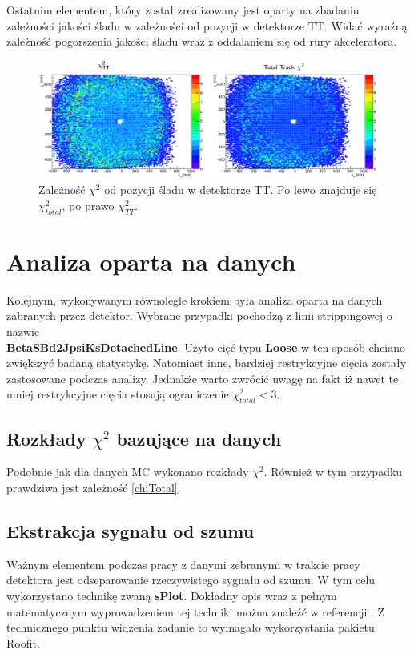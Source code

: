 Ostatnim elementem, który został zrealizowany jest oparty na zbadaniu zależności jakości śladu w zależności od pozycji w detektorze TT. Widać wyraźną zależność pogorszenia jakości śladu wraz z oddalaniem się od rury akceleratora. 

 \begin{figure}[H]
 \centering
 \includegraphics[scale=0.35]{rozdzial6/Chi2_vs_position_TT.png}
 \caption{Zależność $\chi^2$ od pozycji śladu w detektorze TT. Po lewo znajduje się $\chi^2_{total}$, po prawo $\chi^2_{TT}$. }
 \label{rys:BJPsi}
\end{figure}

\section{Analiza oparta na danych}
Kolejnym, wykonywanym równolegle krokiem była analiza oparta na danych zabranych przez detektor. Wybrane przypadki pochodzą z linii strippingowej o nazwie \\ \textbf{BetaSBd2JpsiKsDetachedLine}. Użyto cięć typu \textbf{Loose} w ten sposób chciano zwiększyć badaną statystykę. Natomiast inne, bardziej restrykcyjne cięcia zostały zastosowane podczas analizy. Jednakże warto zwrócić uwagę na fakt iż nawet te mniej restrykcyjne cięcia stosują ograniczenie $\chi^2_{total}<3$. 

\subsection{Rozkłady $\chi^2$ bazujące na danych}
Podobnie jak dla danych MC wykonano rozkłady $\chi^2$. Również w tym przypadku prawdziwa jest zależność \ref{chiTotal}.  

\subsection{Ekstrakcja sygnału od szumu}
Ważnym elementem podczas pracy z danymi zebranymi w trakcie pracy detektora jest odseparowanie rzeczywistego sygnału od szumu. W tym celu wykorzystano technikę zwaną \textbf{sPlot}. Dokładny opis wraz z pełnym matematycznym wyprowadzeniem tej techniki można znaleźć w referencji \cite{sPlot}. Z technicznego punktu widzenia zadanie to wymagało wykorzystania pakietu Roofit. 

